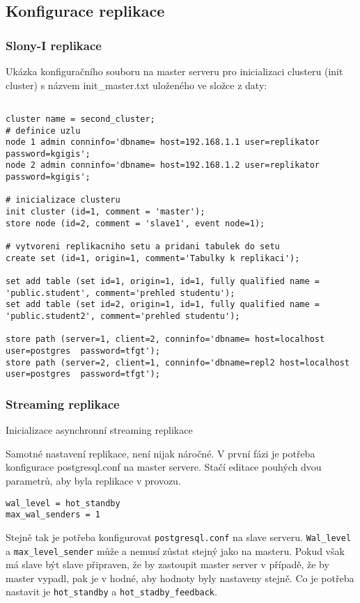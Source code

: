 \subsection{Konfigurace replikace}
\subsubsection{Slony-I replikace}
Ukázka konfiguračního souboru na master serveru pro inicializaci clusteru (init cluster) s názvem init\_master.txt uloženého ve složce z daty:
\begin{lstlisting}[basicstyle=\footnotesize\ttfamily,identifierstyle=\color{black},stringstyle=\color{black},keywordstyle=\color{black},
]

cluster name = second_cluster;
# definice uzlu
node 1 admin conninfo='dbname= host=192.168.1.1 user=replikator password=kgigis';
node 2 admin conninfo='dbname= host=192.168.1.2 user=replikator password=kgigis';

# inicializace clusteru
init cluster (id=1, comment = 'master');
store node (id=2, comment = 'slave1', event node=1);

# vytvoreni replikacniho setu a pridani tabulek do setu
create set (id=1, origin=1, comment='Tabulky k replikaci');

set add table (set id=1, origin=1, id=1, fully qualified name = 'public.student', comment='prehled studentu');
set add table (set id=2, origin=1, id=1, fully qualified name = 'public.student2', comment='prehled studentu');

store path (server=1, client=2, conninfo='dbname= host=localhost user=postgres  password=tfgt');
store path (server=2, client=1, conninfo='dbname=repl2 host=localhost user=postgres  password=tfgt');

\end{lstlisting}
\subsubsection{Streaming replikace}
Inicializace asynchronní streaming replikace

Samotné nastavení replikace, není nijak náročné. V první fázi je potřeba konfigurace postgresql.conf na master servere. Stačí editace pouhých dvou parametrů, aby byla replikace v provozu. 

\begin{lstlisting}
wal_level = hot_standby
max_wal_senders = 1
\end{lstlisting}

Stejně tak je potřeba konfigurovat \texttt{postgresql.conf} na slave serveru. \texttt{Wal\_level} a \texttt{max\_level\_sender} může a nemusí zůstat stejný jako na masteru. Pokud však má slave být slave připraven, že by zastoupit master server v případě, že by master vypadl, pak je v hodné, aby hodnoty byly nastaveny stejně. Co je potřeba nastavit je \texttt{hot\_standby} a \texttt{hot\_stadby\_feedback}.

